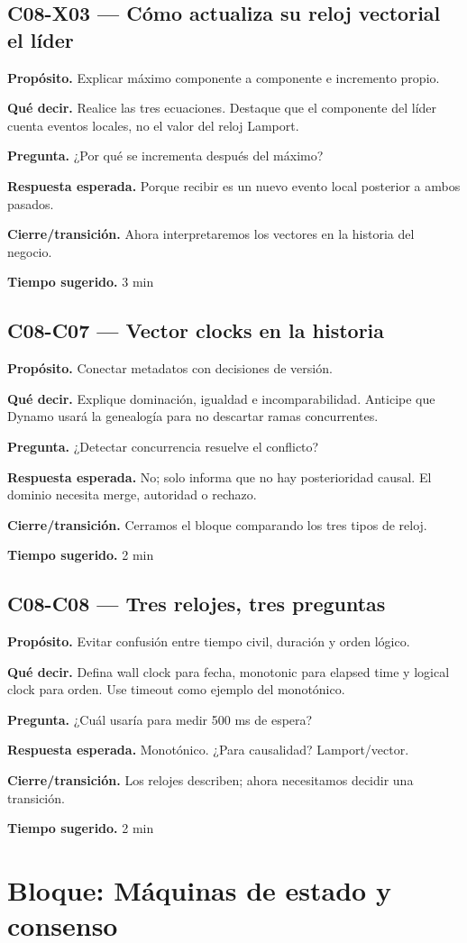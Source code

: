 \documentclass[variant=docente,cover=institutional,mode=screen]{ua-engineering-v6-article}
\newcommand{\FrameField}[2]{\par\noindent\textbf{#1.} #2\par}
\begin{document}
\subsection*{C08-X03 --- Cómo actualiza su reloj vectorial el líder}
\FrameField{Propósito}{Explicar máximo componente a componente e incremento propio.}
\FrameField{Qué decir}{Realice las tres ecuaciones. Destaque que el componente del líder cuenta eventos locales, no el valor del reloj Lamport.}
\FrameField{Pregunta}{¿Por qué se incrementa después del máximo?}
\FrameField{Respuesta esperada}{Porque recibir es un nuevo evento local posterior a ambos pasados.}
\FrameField{Cierre/transición}{Ahora interpretaremos los vectores en la historia del negocio.}
\FrameField{Tiempo sugerido}{3 min}

\subsection*{C08-C07 --- Vector clocks en la historia}
\FrameField{Propósito}{Conectar metadatos con decisiones de versión.}
\FrameField{Qué decir}{Explique dominación, igualdad e incomparabilidad. Anticipe que Dynamo usará la genealogía para no descartar ramas concurrentes.}
\FrameField{Pregunta}{¿Detectar concurrencia resuelve el conflicto?}
\FrameField{Respuesta esperada}{No; solo informa que no hay posterioridad causal. El dominio necesita merge, autoridad o rechazo.}
\FrameField{Cierre/transición}{Cerramos el bloque comparando los tres tipos de reloj.}
\FrameField{Tiempo sugerido}{2 min}

\subsection*{C08-C08 --- Tres relojes, tres preguntas}
\FrameField{Propósito}{Evitar confusión entre tiempo civil, duración y orden lógico.}
\FrameField{Qué decir}{Defina wall clock para fecha, monotonic para elapsed time y logical clock para orden. Use timeout como ejemplo del monotónico.}
\FrameField{Pregunta}{¿Cuál usaría para medir 500 ms de espera?}
\FrameField{Respuesta esperada}{Monotónico. ¿Para causalidad? Lamport/vector.}
\FrameField{Cierre/transición}{Los relojes describen; ahora necesitamos decidir una transición.}
\FrameField{Tiempo sugerido}{2 min}

\section{Bloque: Máquinas de estado y consenso}
\end{document}

